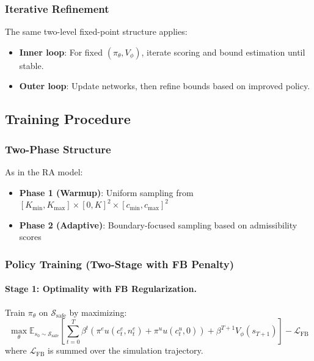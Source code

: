 \subsubsection{Iterative Refinement}
The same two-level fixed-point structure applies:
\begin{itemize}
    \item \textbf{Inner loop}: For fixed $(\pi_\theta, V_\phi)$, iterate scoring and bound estimation until stable.
    \item \textbf{Outer loop}: Update networks, then refine bounds based on improved policy.
\end{itemize}


\subsection{Training Procedure}

\subsubsection{Two-Phase Structure}
As in the RA model:
\begin{itemize}
    \item \textbf{Phase 1 (Warmup)}: Uniform sampling from $[K_{\min}, K_{\max}] \times [0, K]^2 \times [c_{\min}, c_{\max}]^2$
    \item \textbf{Phase 2 (Adaptive)}: Boundary-focused sampling based on admissibility scores
\end{itemize}

\subsubsection{Policy Training (Two-Stage with FB Penalty)}

\paragraph{Stage 1: Optimality with FB Regularization.}
Train $\pi_\theta$ on $\mathcal{S}_{\text{safe}}$ by maximizing:
\begin{equation}
    \max_\theta \mathbb{E}_{s_0 \sim \mathcal{S}_{\text{safe}}} \left[ \sum_{t=0}^{T} \beta^t \left( \pi^e u(c_t^e, n_t^e) + \pi^u u(c_t^u, 0) \right) + \beta^{T+1} V_\phi(s_{T+1}) \right] - \mathcal{L}_{\text{FB}}
\end{equation}
where $\mathcal{L}_{\text{FB}}$ is summed over the simulation trajectory.

